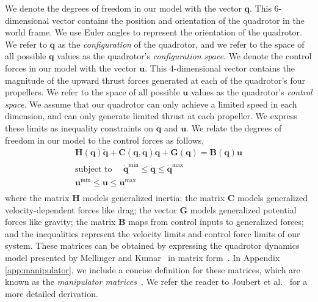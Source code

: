 We denote the degrees of freedom in our model with the vector $\mathbf{q}$.
This 6-dimensional vector contains the position and orientation of the quadrotor in the world frame.
We use Euler angles to represent the orientation of the quadrotor.
We refer to $\mathbf{q}$ as the \emph{configuration} of the quadrotor, and we refer to the space of all possible $\mathbf{q}$ values as the quadrotor's \emph{configuration space}. We denote the control forces in our model with the vector $\mathbf{u}$.
This 4-dimensional vector contains the magnitude of the upward thrust forces generated at each of the quadrotor's four propellers.
We refer to the space of all possible $\mathbf{u}$ values as the quadrotor's \emph{control space}.
We assume that our quadrotor can only achieve a limited speed in each dimension, and can only generate limited thrust at each propeller.
We express these limits as inequality constraints on $\dot{\mathbf{q}}$ and $\mathbf{u}$.
We relate the degrees of freedom in our  model to the control forces as follows,
%
\begin{equation}
\begin{aligned}
\mathbf{H}(\mathbf{q}) \ddot{\mathbf{q}} + \mathbf{C}(\mathbf{q},\dot{\mathbf{q}}) \dot{\mathbf{q}} + \mathbf{G}(\mathbf{q}) = \mathbf{B}(\mathbf{q}) \mathbf{u}\\
\text{subject to~~~~} \dot{\mathbf{q}}^{\text{min}} \leq \dot{\mathbf{q}} \leq \dot{\mathbf{q}}^{\text{max}}~~~~~~~~~\\
                      \mathbf{u}^{\text{min}}       \leq \mathbf{u}       \leq \mathbf{u}^{\text{max}}~~~~~~~~~\\
\end{aligned}
\label{eqn:manipulator}
\end{equation}
%
where
the matrix $\mathbf{H}$ models generalized inertia;
the matrix $\mathbf{C}$ models generalized velocity-dependent forces like drag;
the vector $\mathbf{G}$ models generalized potential forces like gravity;
the matrix $\mathbf{B}$ maps from control inputs to generalized forces;
and the inequalities represent the velocity limits and control force limits of our system.
These matrices can be obtained by expressing the quadrotor dynamics model presented by Mellinger and Kumar~ in matrix form~\cite{joubert:2015}.
In Appendix \ref{app:manipulator}, we include a concise definition for these matrices, which are known as the \emph{manipulator matrices}~\cite{tedrake:2016}.
We refer the reader to Joubert et al.~ for a more detailed derivation.



